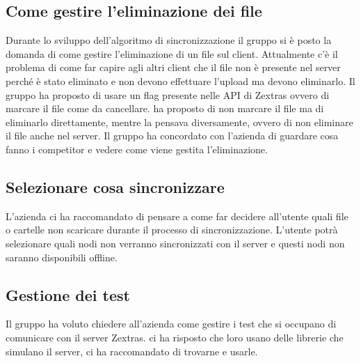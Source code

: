 \subsection{Come gestire l'eliminazione dei file}
Durante lo sviluppo dell'algoritmo di sincronizzazione il gruppo si è posto la domanda di come gestire l'eliminazione di un file sul client. Attualmente c'è il problema di come far capire agli altri client che 
il file non è presente nel server perché è stato eliminato e non devono effettuare l'upload ma devono eliminarlo. Il gruppo ha proposto di usare un flag presente nelle API di Zextras ovvero di marcare il file come 
da cancellare. \textit{\Federico{}} ha proposto di non marcare il file ma di eliminarlo direttamente, mentre \textit{\Alessio{}} la pensava diversamente, ovvero di non eliminare il file anche nel server.
Il gruppo ha concordato con l'azienda di guardare cosa fanno i competitor e vedere come viene gestita l'eliminazione.

\subsection{Selezionare cosa sincronizzare}
L'azienda ci ha raccomandato di pensare a come far decidere all'utente quali file o cartelle non scaricare durante il processo di sincronizzazione.
L'utente potrà selezionare quali nodi non verranno sincronizzati con il server e questi nodi non saranno disponibili offline.

\subsection{Gestione dei test}
Il gruppo ha voluto chiedere all'azienda come gestire i test che si occupano di comunicare con il server Zextras. \textit{\Alessio{}} ci ha risposto che loro usano delle librerie che simulano il server, ci ha raccomandato di trovarne e usarle.

\newpage

